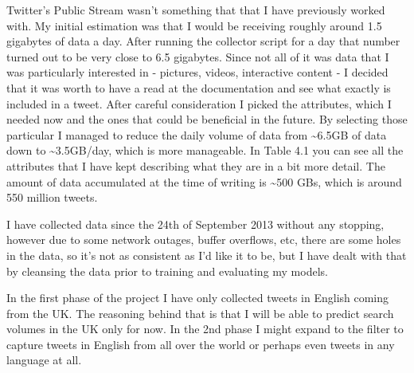 \documentclass[minf,frontabs,twoside,singlespacing,parskip]{infthesis}
\begin{document}
Twitter's Public Stream wasn't something that that I have previously worked with. My initial estimation was that I would be receiving roughly around 1.5 gigabytes of data a day. After running the collector script for a day that number turned out to be very close to 6.5 gigabytes. Since not all of it was data that I was particularly interested in - pictures, videos, interactive content - I decided that it was worth to have a read at the documentation and see what exactly is included in a tweet. \cite{tweetobject} After careful consideration I picked the attributes, which I needed now and the ones that could be beneficial in the future. By selecting those particular I managed to reduce the daily volume of data from \textasciitilde 6.5GB of data down to \textasciitilde 3.5GB/day, which is more manageable. In Table 4.1 you can see all the attributes that I have kept describing what they are in a bit more detail. The amount of data accumulated at the time of writing is \textasciitilde 500 GBs, which is around 550 million tweets. 


I have collected data since the 24th of September 2013 without any stopping, however due to some network outages, buffer overflows, etc, there are some holes in the data, so it's not as consistent as I'd like it to be, but I have dealt with that by cleansing the data prior to training and evaluating my models. 


In the first phase of the project I have only collected tweets in English coming from the UK. The reasoning behind that is that I will be able to predict search volumes in the UK only for now. In the 2nd phase I might expand to the filter to capture tweets in English from all over the world or perhaps even tweets in any language at all. 

\end{document}
